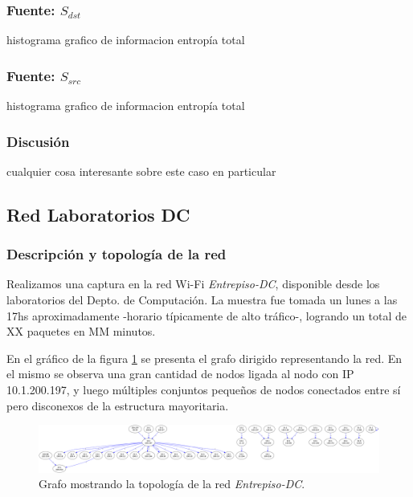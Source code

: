 \documentclass[10pt, a4paper]{article}
\begin{document}
\subsubsection{Fuente: $S_{dst}$}

histograma
grafico de informacion
entropía total

\subsubsection{Fuente: $S_{src}$}

histograma
grafico de informacion
entropía total

\subsubsection{Discusión}

cualquier cosa interesante sobre este caso en particular

\subsection{Red Laboratorios DC}

\subsubsection{Descripción y topología de la red}

Realizamos una captura en la red Wi-Fi \emph{Entrepiso-DC}, disponible desde los laboratorios del Depto. de Computación. La muestra fue tomada un lunes a las 17hs aproximadamente -horario típicamente de alto tráfico-, logrando un total de XX paquetes en MM minutos.

En el gráfico de la figura \ref{fig:entrepiso-dc-grafo} se presenta el grafo dirigido representando la red. En el mismo se observa una gran cantidad de nodos ligada al nodo con IP 10.1.200.197, y luego múltiples conjuntos pequeños de nodos conectados entre sí pero disconexos de la estructura mayoritaria.

\begin{figure}[H]
  \begin{center}
    \includegraphics[width=0.8\linewidth]{../imgs/entrepiso-dc-ips_red.png}
    \caption{Grafo mostrando la topología de la red \emph{Entrepiso-DC}.}
    \label{fig:entrepiso-dc-grafo}
  \end{center}
\end{figure}
\end{document}
